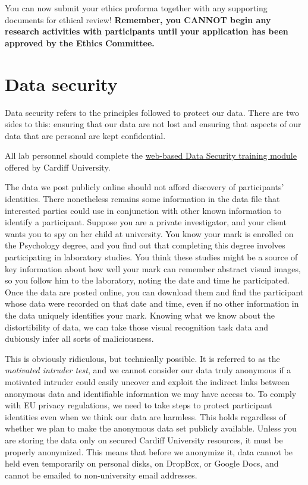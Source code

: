 \documentclass[
  12pt,
]{book}
\newcounter{none} %
\begin{document}
You can now submit your ethics proforma together with any supporting documents for ethical review! \textbf{Remember, you CANNOT begin any research activities with participants until your application has been approved by the Ethics Committee.}

\chapter{Data security}\label{data-security}

Data security refers to the principles followed to protect our data. There are two sides to this: ensuring that our data are not lost and ensuring that aspects of our data that are personal are kept confidential.

All lab personnel should complete the \href{https://intranet.cardiff.ac.uk/staff/news/view/211993-information-security-training-when-will-you-complete-yours}{web-based Data Security training module} offered by Cardiff University.

The data we post publicly online should not afford discovery of participants' identities.
There nonetheless remains some information in the data file that interested parties could use in conjunction with other known information to identify a participant. Suppose you are a private investigator, and your client wants you to spy on her child at university. You know your mark is enrolled on the Psychology degree, and you find out that completing this degree involves participating in laboratory studies. You think these studies might be a source of key information about how well your mark can remember abstract visual images, so you follow him to the laboratory, noting the date and time he participated. Once the data are posted online, you can download them and find the participant whose data were recorded on that date and time, even if no other information in the data uniquely identifies your mark. Knowing what we know about the distortibility of data, we can take those visual recognition task data and dubiously infer all sorts of maliciousness.

This is obviously ridiculous, but technically possible. It is referred to as the \emph{motivated intruder test}, and we cannot consider our data truly anonymous if a motivated intruder could easily uncover and exploit the indirect links between anonymous data and identifiable information we may have access to. To comply with EU privacy regulations, we need to take steps to protect participant identities even when we think our data are harmless. This holds regardless of whether we plan to make the anonymous data set publicly available. Unless you are storing the data only on secured Cardiff University resources, it must be properly anonymized. This means that before we anonymize it, data cannot be held even temporarily on personal disks, on DropBox, or Google Docs, and cannot be emailed to non-university email addresses.
\end{document}
